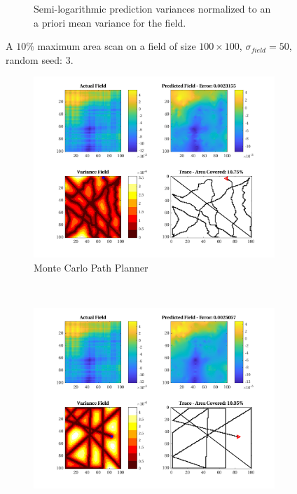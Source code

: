 \begin{figure}[htb!]
\begin{subfigure}[t]{0.65\textwidth}
        \captionsetup{skip=0.20\baselineskip,size=footnotesize}
        \caption{Semi-logarithmic prediction variances normalized to an a priori mean variance for the field.}
        \label{fig:prederrs_sigma50_p10_s3}
    \end{subfigure}
    \captionsetup{skip=0.20\baselineskip}
    \caption{A $10\%$ maximum area scan on a field of size $100 \times 100$, $\sigma_{field} = 50$, random seed: 3.}
    \label{fig:sigma50_p10_s3}
\end{figure}

\begin{figure}[htb!]
    \centering
    \begin{subfigure}[t]{0.5\textwidth}
        \centering
        \includegraphics[width=\linewidth]{figures/hbresults/mc_10p_100x100_sf_50_seed_3.png}
        \captionsetup{skip=0.10\baselineskip,size=footnotesize}
        \caption{Monte Carlo Path Planner}
    \end{subfigure}%
    ~ 
    \begin{subfigure}[t]{0.5\textwidth}
        \centering
        \includegraphics[width=\linewidth]{figures/hbresults/nhv_10p_100x100_sf_50_seed_3.png}

\end{subfigure}
\end{figure}
